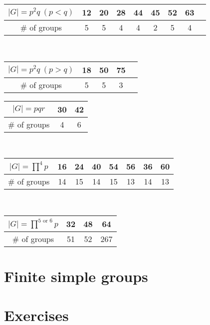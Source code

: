 \documentclass{../../large}
\begin{document}
\begin{prb}
\end{prb}





\begin{table}[h!]
\centering
\begin{tabular}{c|c|ccccccc}
\hline
$|G|=p^2q\ (p<q)$&12&20&28&44&45&52&63\\
\hline
$\#$ of groups&5&5&4&4&2&5&4\\
\hline
\end{tabular}
\vspace{10pt}\\
\begin{tabular}{c|cccc}
\hline
$|G|=p^2q\ (p>q)$&18&50&75\\
\hline
$\#$ of groups&5&5&3\\
\hline
\end{tabular}
\hspace{10pt}
\begin{tabular}{c|cc}
\hline
$|G|=pqr$&30&42\\
\hline
$\#$ of groups&4&6\\
\hline
\end{tabular}
\vspace{10pt}\\
\begin{tabular}{c|c|cccc|c|c}
\hline
$|G|=\prod^4p$&16&24&40&54&56&36&60\\
\hline
$\#$ of groups&14&15&14&15&13&14&13\\
\hline
\end{tabular}
\vspace{10pt}\\
\begin{tabular}{c|c|c||c}
\hline
$|G|=\prod^{5\text{ or }6}p$&32&48&64\\
\hline
$\#$ of groups&51&52&267\\
\hline
\end{tabular}
\end{table}


\section{Finite simple groups}






\section*{Exercises}
\begin{prb}
\end{prb}
\end{document}
